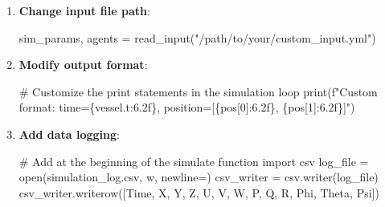 \documentclass[
  letterpaper,
  DIV=11,
  numbers=noendperiod]{scrreprt}
\newenvironment{Shaded}{\begin{snugshade}}{\end{snugshade}}
\newcommand{\BuiltInTok}[1]{\textcolor[rgb]{0.00,0.23,0.31}{#1}}
\newcommand{\CommentTok}[1]{\textcolor[rgb]{0.37,0.37,0.37}{#1}}
\newcommand{\DecValTok}[1]{\textcolor[rgb]{0.68,0.00,0.00}{#1}}
\newcommand{\ImportTok}[1]{\textcolor[rgb]{0.00,0.46,0.62}{#1}}
\newcommand{\NormalTok}[1]{\textcolor[rgb]{0.00,0.23,0.31}{#1}}
\newcommand{\OperatorTok}[1]{\textcolor[rgb]{0.37,0.37,0.37}{#1}}
\newcommand{\SpecialCharTok}[1]{\textcolor[rgb]{0.37,0.37,0.37}{#1}}
\newcommand{\SpecialStringTok}[1]{\textcolor[rgb]{0.13,0.47,0.30}{#1}}
\newcommand{\StringTok}[1]{\textcolor[rgb]{0.13,0.47,0.30}{#1}}
\begin{document}
\begin{enumerate}
\def\labelenumi{\arabic{enumi}.}
\item
  \textbf{Change input file path}:

\begin{Shaded}
\begin{Highlighting}[]
\NormalTok{sim\_params, agents }\OperatorTok{=}\NormalTok{ read\_input(}\StringTok{"/path/to/your/custom\_input.yml"}\NormalTok{)}
\end{Highlighting}
\end{Shaded}
\item
  \textbf{Modify output format}:

\begin{Shaded}
\begin{Highlighting}[]
\CommentTok{\# Customize the print statements in the simulation loop}
\BuiltInTok{print}\NormalTok{(}\SpecialStringTok{f"Custom format: time=}\SpecialCharTok{\{}\NormalTok{vessel}\SpecialCharTok{.}\NormalTok{t}\SpecialCharTok{:6.2f\}}\SpecialStringTok{, position=[}\SpecialCharTok{\{}\NormalTok{pos[}\DecValTok{0}\NormalTok{]}\SpecialCharTok{:6.2f\}}\SpecialStringTok{, }\SpecialCharTok{\{}\NormalTok{pos[}\DecValTok{1}\NormalTok{]}\SpecialCharTok{:6.2f\}}\SpecialStringTok{]"}\NormalTok{)}
\end{Highlighting}
\end{Shaded}
\item
  \textbf{Add data logging}:

\begin{Shaded}
\begin{Highlighting}[]
\CommentTok{\# Add at the beginning of the simulate function}
\ImportTok{import}\NormalTok{ csv}
\NormalTok{log\_file }\OperatorTok{=} \BuiltInTok{open}\NormalTok{(}\StringTok{\textquotesingle{}simulation\_log.csv\textquotesingle{}}\NormalTok{, }\StringTok{\textquotesingle{}w\textquotesingle{}}\NormalTok{, newline}\OperatorTok{=}\StringTok{\textquotesingle{}\textquotesingle{}}\NormalTok{)}
\NormalTok{csv\_writer }\OperatorTok{=}\NormalTok{ csv.writer(log\_file)}
\NormalTok{csv\_writer.writerow([}\StringTok{\textquotesingle{}Time\textquotesingle{}}\NormalTok{, }\StringTok{\textquotesingle{}X\textquotesingle{}}\NormalTok{, }\StringTok{\textquotesingle{}Y\textquotesingle{}}\NormalTok{, }\StringTok{\textquotesingle{}Z\textquotesingle{}}\NormalTok{, }\StringTok{\textquotesingle{}U\textquotesingle{}}\NormalTok{, }\StringTok{\textquotesingle{}V\textquotesingle{}}\NormalTok{, }\StringTok{\textquotesingle{}W\textquotesingle{}}\NormalTok{, }\StringTok{\textquotesingle{}P\textquotesingle{}}\NormalTok{, }\StringTok{\textquotesingle{}Q\textquotesingle{}}\NormalTok{, }\StringTok{\textquotesingle{}R\textquotesingle{}}\NormalTok{, }\StringTok{\textquotesingle{}Phi\textquotesingle{}}\NormalTok{, }\StringTok{\textquotesingle{}Theta\textquotesingle{}}\NormalTok{, }\StringTok{\textquotesingle{}Psi\textquotesingle{}}\NormalTok{])}


\end{Highlighting}
\end{Shaded}
\end{enumerate}
\end{document}
